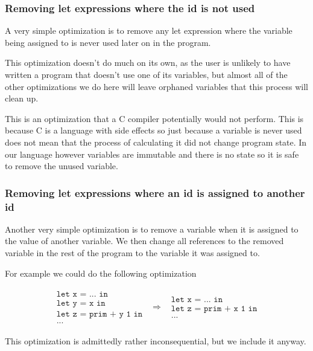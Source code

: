 \documentclass[a4paper]{article}
\newcommand{\optimization}[2]{
	\[
		\begin{array}{rcl}
			#1 & \Rightarrow & #2
		\end{array}
	\]
}
\begin{document}

\subsubsection{Removing let expressions where the id is not used}

A very simple optimization is to remove any let expression where the variable being assigned to is never used later on in the program.

This optimization doesn't do much on its own, as the user is unlikely to have written a program that doesn't use one of its variables, but almost all of the other optimizations we do here will leave orphaned variables that this process will clean up.

This is an optimization that a C compiler potentially would not perform. This is because C is a language with side effects so just because a variable is never used does not mean that the process of calculating it did not change program state. In our language however variables are immutable and there is no state so it is safe to remove the unused variable.




\subsubsection{Removing let expressions where an id is assigned to another id}

Another very simple optimization is to remove a variable when it is assigned to the value of another variable. We then change all references to the removed variable in the rest of the program to the variable it was assigned to.

For example we could do the following optimization

\optimization{
	\begin{array}{l}
		\texttt{let x = ... in} \\
		\texttt{let y = x in} \\
		\texttt{let z = prim + y 1 in}\\
		\texttt{...}
	\end{array}
}{
	\begin{array}{l}
		\texttt{let x = ... in} \\
		\texttt{let z = prim + x 1 in}\\
		\texttt{...}
	\end{array}
}
This optimization is admittedly rather inconsequential, but we include it anyway.
\end{document}

